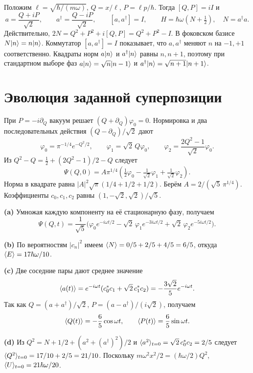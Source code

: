 \documentclass[11pt,a4paper]{article}
\begin{document}

Положим \(\ell=\sqrt{\hbar/(m\omega)}\), \(Q=x/\ell\),
\(P=\ell p/\hbar\). Тогда \([Q,P]=iI\) и
\[
 a=\frac{Q+iP}{\sqrt2},\qquad
 a^\dagger=\frac{Q-iP}{\sqrt2},\qquad
 [a,a^\dagger]=I,\qquad H=\hbar\omega(N+\tfrac12),\quad N=a^\dagger a .
\]
Действительно, \(2N=Q^2+P^2+i[Q,P]=Q^2+P^2-I\).
В фоковском базисе \(N\lvert n\rangle=n\lvert n\rangle\).
Коммутатор \([a,a^\dagger]=I\) показывает, что \(a,a^\dagger\)
меняют \(n\) на \(-1,+1\) соответственно.
Квадраты норм \(a\lvert n\rangle\) и \(a^\dagger\lvert n\rangle\) равны
\(n,n+1\), поэтому при стандартном выборе фаз
\(a\lvert n\rangle=\sqrt n\lvert n-1\rangle\) и
\(a^\dagger\lvert n\rangle=\sqrt{n+1}\lvert n+1\rangle\).

\section{Эволюция заданной суперпозиции}

При \(P=-i\partial_Q\) вакуум решает \((Q+\partial_Q)\varphi_0=0\).
Нормировка и два последовательных действия
\((Q-\partial_Q)/\sqrt2\) дают
\[
 \varphi_0=\pi^{-1/4}e^{-Q^2/2},\qquad
 \varphi_1=\sqrt2\,Q\varphi_0,\qquad
 \varphi_2=\frac{2Q^2-1}{\sqrt2}\varphi_0 .
\]
Из \(Q^2-Q=\tfrac12+(2Q^2-1)/2-Q\) следует
\[
 \Psi(Q,0)=A\pi^{1/4}
       \left(\tfrac12\varphi_0-\tfrac1{\sqrt2}\varphi_1
                                 +\tfrac1{\sqrt2}\varphi_2\right).
\]
Норма в квадрате равна \(|A|^2\sqrt\pi(1/4+1/2+1/2)\).
Берём \(A=2/(\sqrt5\,\pi^{1/4})\).
Коэффициенты \(c_0,c_1,c_2\) равны \((1,-\sqrt2,\sqrt2)/\sqrt5\).

\textbf{(a)} Умножая каждую компоненту на её стационарную фазу,
получаем
\[
 \Psi(Q,t)=\frac{1}{\sqrt5}\bigl(
 \varphi_0 e^{-i\omega t/2}-\sqrt2\,\varphi_1e^{-3i\omega t/2}
                    +\sqrt2\,\varphi_2e^{-5i\omega t/2}\bigr).
\]

\textbf{(b)} По вероятностям \(|c_n|^2\) имеем
\(\langle N\rangle=0/5+2/5+4/5=6/5\), откуда
\(\langle E\rangle=17\hbar\omega/10\).

\textbf{(c)} Две соседние пары дают среднее значение
\[
 \langle a(t)\rangle=e^{-i\omega t}(c_0^*c_1+\sqrt2\,c_1^*c_2)
           =-\frac{3\sqrt2}{5}e^{-i\omega t}.
\]
Так как \(Q=(a+a^\dagger)/\sqrt2\),
\(P=(a-a^\dagger)/(i\sqrt2)\), получаем
\[
 \langle Q(t)\rangle=-\frac65\cos\omega t,\qquad
 \langle P(t)\rangle=\frac65\sin\omega t .
\]

\textbf{(d)} Из \(Q^2=N+1/2+(a^2+(a^\dagger)^2)/2\) и
\(\langle a^2\rangle_{t=0}=\sqrt2\,c_0^*c_2=2/5\) следует
\(\langle Q^2\rangle_{t=0}=17/10+2/5=21/10\).
Поскольку \(m\omega^2 x^2/2=(\hbar\omega/2)Q^2\),
\(\langle U\rangle_{t=0}=21\hbar\omega/20\).
\end{document}
